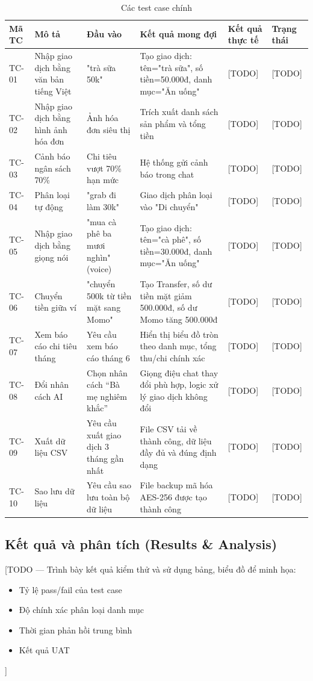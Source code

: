 \begin{table}[htbp]
\centering
\begin{tabularx}{\textwidth}{|l|p{3.5cm}|X|p{2cm}|p{2cm}|p{1.5cm}|}
\hline
\textbf{Mã TC} & \textbf{Mô tả} & \textbf{Đầu vào} & \textbf{Kết quả mong đợi} & \textbf{Kết quả thực tế} & \textbf{Trạng thái} \\ \hline
TC-01 & Nhập giao dịch bằng văn bản tiếng Việt & "trà sữa 50k" & Tạo giao dịch: tên="trà sữa", số tiền=50.000đ, danh mục="Ăn uống" & [TODO] & [TODO] \\ \hline
TC-02 & Nhập giao dịch bằng hình ảnh hóa đơn & Ảnh hóa đơn siêu thị & Trích xuất danh sách sản phẩm và tổng tiền & [TODO] & [TODO] \\ \hline
TC-03 & Cảnh báo ngân sách 70\% & Chi tiêu vượt 70\% hạn mức & Hệ thống gửi cảnh báo trong chat & [TODO] & [TODO] \\ \hline
TC-04 & Phân loại tự động & "grab đi làm 30k" & Giao dịch phân loại vào "Di chuyển" & [TODO] & [TODO] \\ \hline
TC-05 & Nhập giao dịch bằng giọng nói & "mua cà phê ba mươi nghìn" (voice) & Tạo giao dịch: tên="cà phê", số tiền=30.000đ, danh mục="Ăn uống" & [TODO] & [TODO] \\ \hline
TC-06 & Chuyển tiền giữa ví & "chuyển 500k từ tiền mặt sang Momo" & Tạo Transfer, số dư tiền mặt giảm 500.000đ, số dư Momo tăng 500.000đ & [TODO] & [TODO] \\ \hline
TC-07 & Xem báo cáo chi tiêu tháng & Yêu cầu xem báo cáo tháng 6 & Hiển thị biểu đồ tròn theo danh mục, tổng thu/chi chính xác & [TODO] & [TODO] \\ \hline
TC-08 & Đổi nhân cách AI & Chọn nhân cách ``Bà mẹ nghiêm khắc'' & Giọng điệu chat thay đổi phù hợp, logic xử lý giao dịch không đổi & [TODO] & [TODO] \\ \hline
TC-09 & Xuất dữ liệu CSV & Yêu cầu xuất giao dịch 3 tháng gần nhất & File CSV tải về thành công, dữ liệu đầy đủ và đúng định dạng & [TODO] & [TODO] \\ \hline
TC-10 & Sao lưu dữ liệu & Yêu cầu sao lưu toàn bộ dữ liệu & File backup mã hóa AES-256 được tạo thành công & [TODO] & [TODO] \\ \hline
\end{tabularx}
\caption{Các test case chính}
\label{tab:test_cases}
\end{table}

\subsection{Kết quả và phân tích (Results \& Analysis)}
\label{subsec:test_results}

[TODO --- Trình bày kết quả kiểm thử và sử dụng bảng, biểu đồ để minh họa:
\begin{itemize}
    \item Tỷ lệ pass/fail của test case
    \item Độ chính xác phân loại danh mục
    \item Thời gian phản hồi trung bình
    \item Kết quả UAT
\end{itemize}
]
